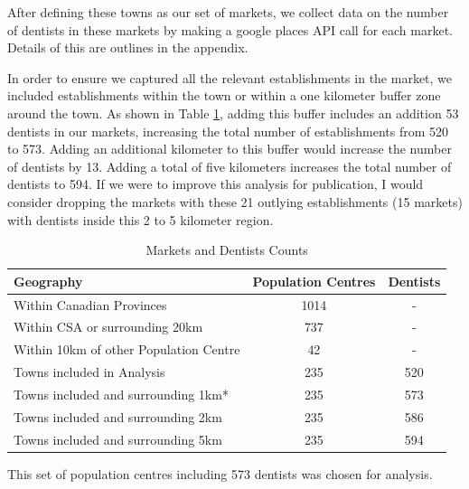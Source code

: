\documentclass[a4paper,11pt]{article}
\begin{document}
After defining these towns as our set of markets, we collect data on the number of dentists in these markets by making a google places API call for each market. Details of this are outlines in the appendix. 

In order to ensure we captured all the relevant establishments in the market, we included establishments within the town or within a one kilometer buffer zone around the town. As shown in Table \ref{MrkCounts}, adding this buffer includes an addition 53 dentists in our markets, increasing the total number of establishments from 520 to 573.  Adding an additional kilometer to this buffer would increase the number of dentists by 13. Adding a total of five kilometers increases the total number of dentists to 594. If we were to improve this analysis for publication, I would consider dropping the markets with these 21 outlying establishments (15 markets) with dentists inside this 2 to 5 kilometer region. 

\begin{table} 
\begin{threeparttable}
\caption{Markets and Dentists Counts} %
\label{MrkCounts}
\centering %
\begin{tabular}{l c c } %
\hline\hline   
 Geography & Population Centres & Dentists   
\\ [0.5ex]  
\hline   
Within Canadian Provinces & 1014 &  -\\
Within CSA or surrounding 20km & 737 & -  \\
Within 10km of other Population Centre & 42 & - \\
Towns included in Analysis  & 235 & 520 \\

Towns included and surrounding 1km* & 235 & 573 \\

Towns included and surrounding 2km  & 235 & 586 \\

Towns included  and surrounding 5km  & 235 & 594 \\

\hline %
\end{tabular}  
    \small  *This set of population centres including 573 dentists was chosen for analysis. 
\end{threeparttable}
\end{table}  
\end{document}

